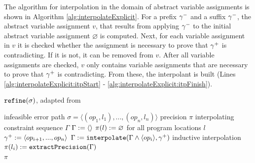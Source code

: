 The algorithm for interpolation in the domain of abstract variable assignments is shown in Algorithm \ref{alg:interpolateExplicit}.
For a prefix ${\gamma^{-}}$ and a suffix ${\gamma^{-}}$, the abstract variable assignment $v$, that results from applying ${\gamma^{-}}$ to the initial abstract variable assignment $\varnothing$ is computed.
Next, for each variable assignment in $v$ it is checked whether the assignment is necessary to prove that ${\gamma^{+}}$ is contradicting.
If it is not, it can be removed from $v$.
After all variable assignments are checked, $v$ only contains variable assignments that are necessary to prove that ${\gamma^{+}}$ is contradicting.
From these, the interpolant is built (Lines \ref{alg:interpolateExplicit:itpStart} - \ref{alg:interpolateExplicit:itpFinish}).

\begin{algorithm}[t]
\caption{$\texttt{refine}(\sigma)$, adapted from \cite{Beyer2015}}
\label{alg:refinementExplicit}
\begin{algorithmic}[1]
\Input infeasible error path $\sigma = \langle (op_1, l_1), ..., (op_n, l_n) \rangle$
\Output precision $\pi$
\Variables interpolating constraint sequence $\Gamma$
\State $\Gamma := \langle \rangle$
\State $\pi(l) := \varnothing$ for all program locations $l$
\label{alg:refinementExplicit:loopStart}
	\State ${\gamma^{+}} := \langle op_{i+1}, ..., op_n \rangle$
	\State $\Gamma := \texttt{interpolate}(\Gamma \wedge \langle op_i \rangle, {\gamma^{+}})$ \Comment inductive interpolation \label{alg:refinementExplicit:interpolation}
	\State $\pi(l_i) := \texttt{extractPrecision}(\Gamma)$
\EndFor\\
\Return $\pi$
\end{algorithmic}
\end{algorithm}

